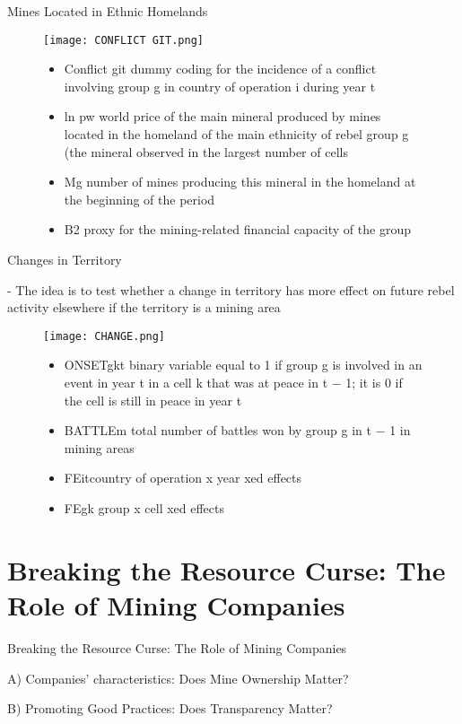 \documentclass[pdftex,12pt,xcolor=pdftex,table]{beamer}
\theoremstyle{definition}
\theoremstyle{remark}
\numberwithin{equation}{section}
\numberwithin{figure}{section}
\begin{document}
\begin{frame}{Mines Located in Ethnic Homelands}
	\begin{figure}[H]
				\centering
				\texttt{[image: CONFLICT GIT.png]}
				\justifying
		\begin{itemize}	
\item \alert{Conflict git} dummy coding for the incidence of a conflict involving group g in country of operation i during year t
\item \alert{ln pw} world price of the main mineral produced by mines located in the homeland of the main ethnicity of rebel group g (the mineral observed in the largest number of cells
\item \alert{Mg} number of mines producing this mineral in the homeland at the beginning of the period
\item \alert{B2} proxy for the mining-related financial capacity of the group 
\end{itemize}
         \end{figure}
    \end{frame}
		
		
		\begin{frame}{Changes in Territory}
			\justifying
\item - The idea is to test whether a change in territory has more effect on future rebel activity elsewhere if the territory is a mining area
			\begin{figure}[H]
				\centering
				\texttt{[image: CHANGE.png]}
				\justifying
		\begin{itemize}		
\item \alert{ONSETgkt} binary variable equal to 1 if group g is involved in an event in year t in a cell k that was at peace in t − 1; it is 0 if the cell is still in peace in year t
\item \alert{BATTLEm} total number of battles won by group g in t − 1 in mining areas
\item \alert{FEit}country of operation x year xed effects
\item \alert{FEgk} group x cell xed effects
  \end{itemize}
			\end{figure}
		\end{frame}
	
	\section{Breaking the Resource Curse: The Role of Mining Companies}
		\begin{frame}{Breaking the Resource Curse: The Role of Mining Companies}
			\justifying
\item A) Companies' characteristics: Does Mine Ownership Matter?
\item B) Promoting Good Practices: Does Transparency Matter?
	\end{frame}
	
\end{document}
